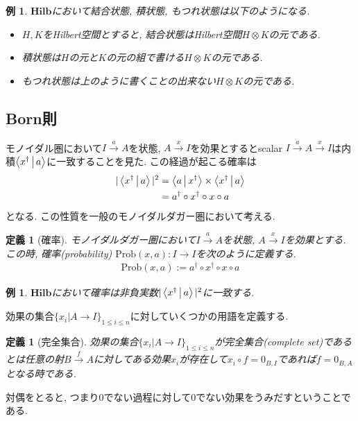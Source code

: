 \documentclass[a4paper,12pt]{ltjsarticle}
\theoremstyle{break}
\newtheorem{defn}[thm]{定義}
\newtheorem{eg}[thm]{例}
\newcommand{\hilb}{\mathbf{Hilb}}
\newcommand{\prob}{\mathrm{Prob}}
\newcommand{\xr}[1]{\xrightarrow{#1}}
\newcommand{\ci}{\circ}
\newcommand{\da}{\dagger}
\newcommand{\ot}{\otimes}
\newcommand{\ti}{\times}
\numberwithin{equation}{section}
\begin{document}
\begin{eg}
  $\hilb$において結合状態, 積状態, もつれ状態は以下のようになる. 
  \begin{itemize}
    \item $H,K$をHilbert空間とすると, 結合状態はHilbert空間$H \ot K$の元である. 
    \item 積状態は$H$の元と$K$の元の組で書ける$H \ot K$の元である. 
    \item もつれ状態は上のように書くことの出来ない$H \ot K$の元である. 
  \end{itemize} 
\end{eg}

\subsection{Born則}

モノイダル圏において$I \xr{a} A$を状態, $A \xr{x} I$を効果とするとscalar $I \xr{a} A \xr{x} I$は内積$\Braket{x^\da|a}$に一致することを見た. 
この経過が起こる確率は
\begin{align*}
  |\Braket{x^\da|a}|^2 
  &= \Braket{a|x^\da} \ti \Braket{x^\da|a} \\
  &= a^\da \circ x^\da \circ x \circ a
\end{align*}
となる. 
この性質を一般のモノイダルダガー圏において考える. 

\begin{defn}[確率]
  モノイダルダガー圏において$I \xr{a} A$を状態, $A \xr{x} I$を効果とする. 
  この時, 確率(probability) $\prob(x,a): I \to I$を次のように定義する.
  \begin{align*}
    \prob(x,a) := a^\da \ci x^\da \ci x \ci a 
  \end{align*} 
\end{defn}

\begin{eg}
  $\hilb$において確率は非負実数$|\Braket{x^\da|a}|^2$に一致する. 
\end{eg}

効果の集合$\{x_i | A \to I\}_{1 \leq i \leq n}$に対していくつかの用語を定義する. 

\begin{defn}[完全集合]
  効果の集合$\{x_i | A \to I\}_{1 \leq i \leq n}$が完全集合(complete set)であるとは任意の射$B \xr{f} A$に対してある効果$x_i$が存在して$x_i \ci f = 0_{B,I}$であれば$f = 0_{B,A}$となる時である. 
\end{defn}

対偶をとると, つまり$0$でない過程に対して$0$でない効果をうみだすということである. 
\end{document}
